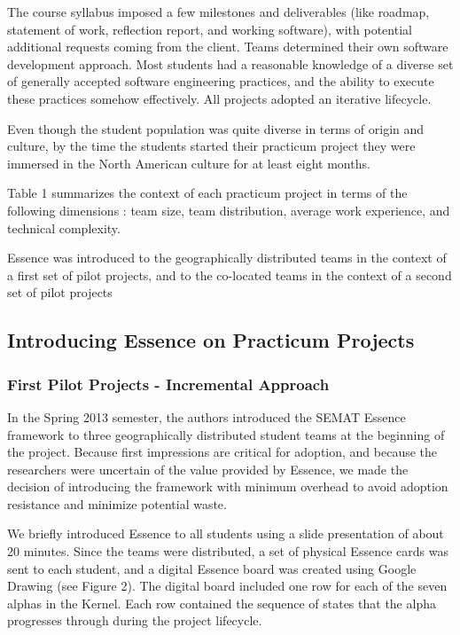 The course syllabus imposed a few milestones and deliverables (like roadmap, statement of work, reflection report, and working software), with potential additional requests coming from the client. Teams determined their own software development approach. Most students had a reasonable knowledge of a diverse set of generally accepted software engineering practices, and the ability to execute these practices somehow effectively. All projects adopted an iterative lifecycle.

Even though the student population was quite diverse in terms of origin and culture, by the time the students started their practicum project they were immersed in the North American culture for at least eight months.

Table 1 summarizes the context of each practicum project in terms of the following dimensions \cite{AmblerDAD, BoehmBalancingAgilityAndDiscipline, KruchtenContextualizingAgile}: team size, team distribution, average work experience, and technical complexity.

Essence was introduced to the geographically distributed teams in the context of a first set of pilot projects, and to the co-located teams in the context of a second set of pilot projects

\subsection{Introducing Essence on Practicum Projects}
\subsubsection{First Pilot Projects - Incremental Approach}
In the Spring 2013 semester, the authors introduced the SEMAT Essence framework to three geographically distributed student teams at the beginning of the project. Because first impressions are critical for adoption, and because the researchers were uncertain of the value provided by Essence, we made the decision of introducing the framework with minimum overhead to avoid adoption resistance and minimize potential waste.

We briefly introduced Essence to all students using a slide presentation of about 20 minutes. Since the teams were distributed, a set of physical Essence cards was sent to each student, and a digital Essence board was created using Google Drawing (see Figure 2). The digital board included one row for each of the seven alphas in the Kernel. Each row contained the sequence of states that the alpha progresses through during the project lifecycle.

